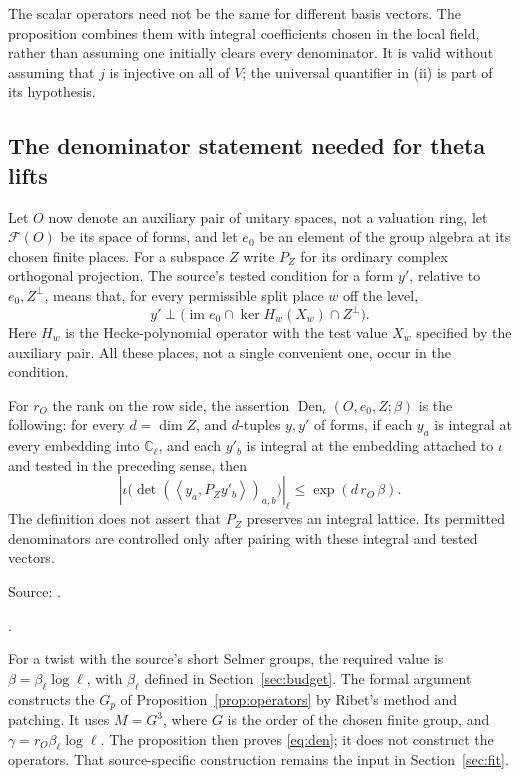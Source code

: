 \documentclass[11pt,a4paper]{article}
\theoremstyle{definition}
\newcommand{\C}{\mathbb C}
\newcommand{\abs}[1]{\left|#1\right|}
\newcommand{\ip}[2]{\left\langle#1,#2\right\rangle}
\newcommand{\im}{\operatorname{im}}
\newcommand{\src}[2]{\par\smallskip\begingroup\footnotesize\noindent Source: \path{#1}.\par\noindent\path{#2}.\par\endgroup}
\begin{document}
The scalar operators need not be the same for different basis vectors.
The proposition combines them with integral coefficients chosen in the
local field, rather than assuming one initially clears every denominator.
It is valid without assuming that \(j\) is injective on all of \(V\);
the universal quantifier in (ii) is part of its hypothesis.

\subsection{The denominator statement needed for theta lifts}\label{sec:den-def}
Let \(O\) now denote an auxiliary pair of unitary spaces, not a valuation ring,
let \(\mathcal F(O)\) be its space of forms, and let \(e_0\) be an element
of the group algebra at its chosen finite places. For a subspace \(Z\) write
\(P_Z\) for its ordinary complex orthogonal projection.
The source's tested condition for a form \(y'\), relative to \(e_0,Z^\perp\),
means that, for every permissible split place \(w\) off the level,
\[
 y'\perp
 \bigl(\im e_0\cap\ker H_w(X_w)\cap Z^\perp\bigr).
\]
Here \(H_w\) is the Hecke-polynomial operator with the test value \(X_w\)
specified by the auxiliary pair. All these places, not a single convenient
one, occur in the condition.

For \(r_O\) the rank on the row side, the assertion
\(\operatorname{Den}_\iota(O,e_0,Z;\beta)\) is the following:
for every \(d=\dim Z\), and \(d\)-tuples \(y,y'\) of forms, if each \(y_a\)
is integral at every embedding into \(\C_\ell\), and each \(y'_b\) is integral
at the embedding attached to \(\iota\) and tested in the preceding sense,
then
\begin{equation}\label{eq:den}
 \abs{\iota\bigl(\det(\ip{y_a}{P_Zy'_b})_{a,b}\bigr)}_\ell
 \le \exp(d\,r_O\,\beta).
\end{equation}
The definition does not assert that \(P_Z\) preserves an integral lattice.
Its permitted denominators are controlled only after pairing with these
integral and tested vectors.
\src{New/Selmer/FitTwists.lean}{DenominatorLe}

For a twist with the source's short Selmer groups, the required value is
\(\beta=\beta_\ell\log\ell\), with \(\beta_\ell\) defined in
Section~\ref{sec:budget}.
The formal argument constructs the \(G_p\) of
Proposition~\ref{prop:operators} by Ribet's method and patching.
It uses \(M=G^3\), where \(G\) is the order of the chosen finite group, and
\(\gamma=r_O\beta_\ell\log\ell\).
The proposition then proves \eqref{eq:den}; it does not construct the
operators. That source-specific construction remains the input
in Section~\ref{sec:fit}.
\end{document}

